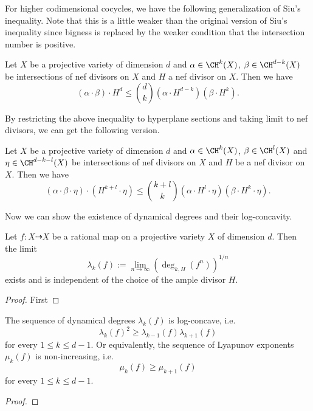   For higher codimensional cocycles, we have the following generalization of Siu's inequality.
  Note that this is a little weaker than the original version of Siu's inequality since bigness is replaced by the weaker condition that the intersection number is positive.

  \begin{theorem}\label{thm:generalized_Siu_inequality}
    Let $X$ be a projective variety of dimension $d$ and $\alpha \in \CH^k(X)$, $\beta \in \CH^{d-k}(X)$ be intersections of nef divisors on $X$ and $H$ a nef divisor on $X$.
    Then we have 
    \[ (\alpha \cdot \beta) \cdot H^{d} \leq \binom{d}{k} (\alpha \cdot H^{d-k}) (\beta \cdot H^{k}). \]
  \end{theorem}

  By restricting the above inequality to hyperplane sections and taking limit to nef divisors, we can get the following version.

  \begin{corollary}
    Let $X$ be a projective variety of dimension $d$ and $\alpha \in \CH^k(X)$, $\beta \in \CH^l(X)$ and 
    $\eta \in \CH^{d-k-l}(X)$ be intersections of nef divisors on $X$ and $H$ be a nef divisor on $X$.
    Then we have
    \[ (\alpha \cdot \beta \cdot \eta) \cdot (H^{k+l} \cdot \eta) \leq \binom{k+l}{k} (\alpha \cdot H^{l} \cdot \eta) (\beta \cdot H^{k} \cdot \eta). \]
  \end{corollary}

  Now we can show the existence of dynamical degrees and their log-concavity.

  \begin{proposition}
    Let $f: X \dashrightarrow X$ be a rational map on a projective variety $X$ of dimension $d$.
    Then the limit 
    \[ \lambda_k(f) := \lim_{n \to \infty} \left(\deg_{k,H}(f^n)\right)^{1/n} \]
    exists and is independent of the choice of the ample divisor $H$.
  \end{proposition}
  \begin{proof}
    First 

    \Yang{}
  \end{proof}

  \begin{proposition}
    The sequence of dynamical degrees $\lambda_k(f)$ is log-concave, i.e. 
    \[ \lambda_k(f)^2 \geq \lambda_{k-1}(f) \lambda_{k+1}(f)\] 
    for every $1 \leq k \leq d-1$.
    Or equivalently, the sequence of Lyapunov exponents $\mu_k(f)$ is non-increasing, i.e.
    \[ \mu_k(f) \geq \mu_{k+1}(f) \]
    for every $1 \leq k \leq d-1$.
  \end{proposition}
  \begin{proof}
    
    \Yang{}
  \end{proof}



